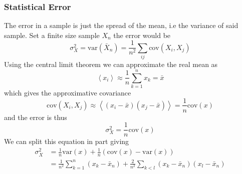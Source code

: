 \documentclass[a4paper, hidelinks, 10pt]{article}
\newcommand{\ecp}[1]{\left< {#1} \right>} %
\newcommand{\suml}[2]{\sum\limits_{#1=1}^{#2}}
\begin{document}
\subsubsection{Statistical Error}
\label{ssub:statistical_error}
    The error in a sample is just the spread of the mean, i.e the variance of
    said sample. Set a finite size sample $X_n$ the error would be
        \begin{equation}
            \sigma^2_X = \text{var}\left(\bar{X}_n\right) =
            \frac{1}{n^2}\sum\limits_{ij}\text{cov}\left(X_i,X_j\right)
            \label{eq:error}
        \end{equation}
    Using the central limit theorem we can approximate the real mean as
        \begin{equation}
            \ecp{x_i} \approx \frac{1}{n}\suml{k}{n} x_k  = \bar{x}
            \label{eq:meanapprox}
        \end{equation}
    which gives the approximative covariance
        \begin{equation}
            \text{cov}\left(X_i,X_j\right) \approx
            \ecp{(x_i-\bar{x})(x_j-\bar{x})} = \frac{1}{n}\text{cov}(x)
            \label{eq:covapprox}
        \end{equation}
    and the error is thus
        \begin{equation}
            \sigma^2_X = \frac{1}{n}\text{cov}(x)
            \label{eq:errorfinal}
        \end{equation}
    We can split this equation in part giving
        \begin{align}
            \sigma^2_X &= \frac{1}{n}\text{var}(x) +
            \frac{1}{n}\left(\text{cov}(x) - \text{var}(x)\right) \nonumber \\
            &= \frac{1}{n^2}\suml{k}{n} \left(x_k - \bar{x}_n\right) +
            \frac{2}{n^2}\sum\limits_{k<l}
            \left(x_k-\bar{x}_n\right)\left(x_l-\bar{x}_n\right)
            \label{eq:errorSplit}
        \end{align}
\end{document}
